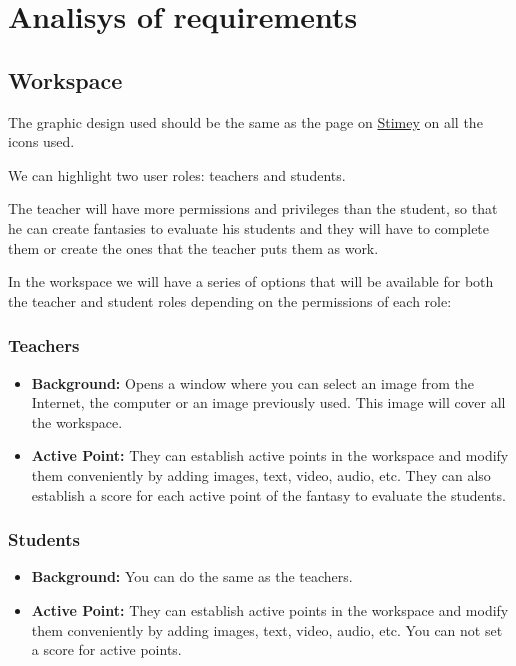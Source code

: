 \chapter{Analisys of requirements}
\section{Workspace}
The graphic design used should be the same as the page on \href{https://stimey.eu/home}{Stimey} on all the icons used.

We can highlight two user roles: teachers and students.

The teacher will have more permissions and privileges than the student, so that he can create fantasies to evaluate his students and they will have to complete them or create the ones that the teacher puts them as work.

In the workspace we will have a series of options that will be available for both the teacher and student roles depending on the permissions of each role:

\subsection{Teachers}
\begin{itemize}
	\item \textbf{Background:} Opens a window where you can select an image from the Internet, the computer or an image previously used. This image will cover all the workspace.
	\item \textbf{Active Point:} They can establish active points in the workspace and modify them conveniently by adding images, text, video, audio, etc. They can also establish a score for each active point of the fantasy to evaluate the students.
\end{itemize}

\subsection{Students}
\begin{itemize}
	\item \textbf{Background:} You can do the same as the teachers.
	\item \textbf{Active Point:} They can establish active points in the workspace and modify them conveniently by adding images, text, video, audio, etc. You can not set a score for active points.
\end{itemize}



